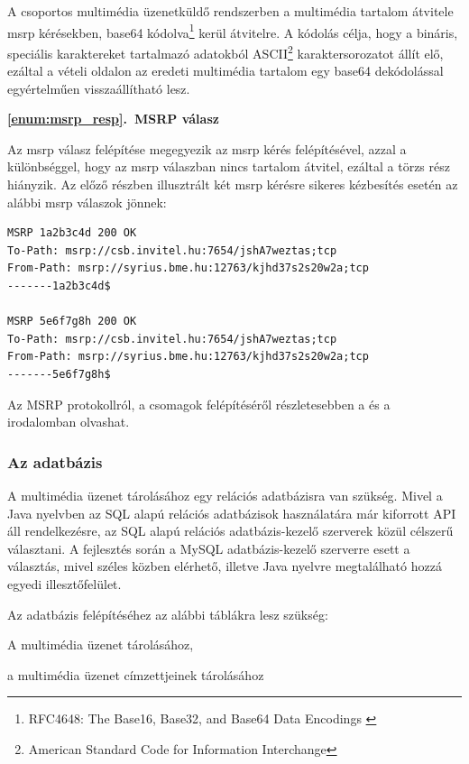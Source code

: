 A csoportos multimédia üzenetküldő rendszerben a multimédia tartalom átvitele msrp kérésekben, base64 kódolva\footnote{RFC4648: The Base16, Base32, and Base64 Data Encodings \cite{rfc4648}} kerül átvitelre. A kódolás célja, hogy a bináris, speciális karaktereket tartalmazó adatokból ASCII\footnote{American Standard Code for Information Interchange} karaktersorozatot állít elő, ezáltal a vételi oldalon az eredeti multimédia tartalom egy base64 dekódolással egyértelműen visszaállítható lesz.
\bigskip

\noindent
{\bf \ref{enum:msrp_resp}.~MSRP válasz}

Az msrp válasz felépítése megegyezik az msrp kérés felépítésével, azzal a különbséggel, hogy az msrp válaszban nincs tartalom átvitel, ezáltal a törzs rész hiányzik. Az előző részben illusztrált két msrp kérésre sikeres kézbesítés esetén az alábbi msrp válaszok jönnek:
\fontsize{10}{10}
\begin{verbatim}
MSRP 1a2b3c4d 200 OK
To-Path: msrp://csb.invitel.hu:7654/jshA7weztas;tcp
From-Path: msrp://syrius.bme.hu:12763/kjhd37s2s20w2a;tcp
-------1a2b3c4d$

MSRP 5e6f7g8h 200 OK
To-Path: msrp://csb.invitel.hu:7654/jshA7weztas;tcp
From-Path: msrp://syrius.bme.hu:12763/kjhd37s2s20w2a;tcp
-------5e6f7g8h$
\end{verbatim}
\fontsize{12}{12} 

\bigskip

Az MSRP protokollról, a csomagok felépítéséről részletesebben a \cite{rfc4975} és a \cite{rfc4976} irodalomban olvashat.

\subsubsection{Az adatbázis}
\label{sec:adatb}

A multimédia üzenet tárolásához egy relációs adatbázisra van szükség. Mivel a Java nyelvben az SQL alapú relációs adatbázisok használatára már kiforrott API áll rendelkezésre, az SQL alapú relációs adatbázis-kezelő szerverek közül célszerű választani. A fejlesztés során a MySQL adatbázis-kezelő szerverre esett a választás, mivel széles közben elérhető, illetve Java nyelvre megtalálható hozzá egyedi illesztőfelület.

Az adatbázis felépítéséhez az alábbi táblákra lesz szükség:

\begin{myitemize}
\item A multimédia üzenet tárolásához,
\item a multimédia üzenet címzettjeinek tárolásához
\end{myitemize}

